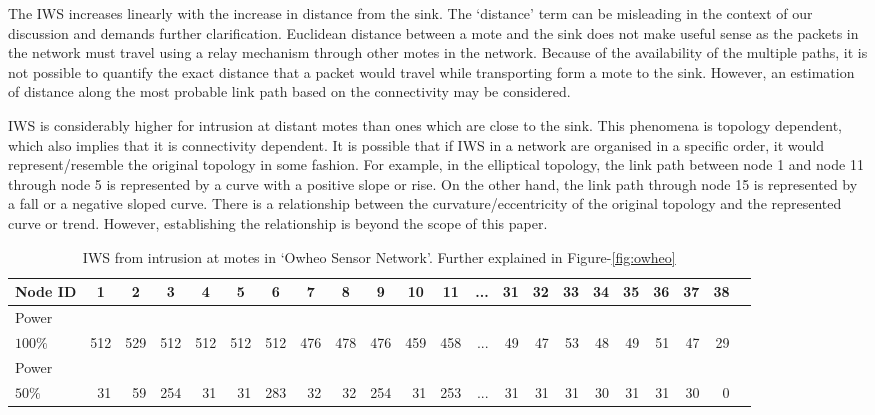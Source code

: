 \documentclass[conference,final]{IEEEtran}
\newcommand*{\bd}[1]{\multicolumn{1}{|c}{\bfseries #1}}
\begin{document}
The IWS increases linearly with the increase in distance from the sink.
The `distance' term can be misleading in the context of our discussion and demands further clarification.
Euclidean distance between a mote and the sink does not make useful sense as the packets in the network must travel using a relay mechanism through other motes in the network.
Because of the availability of the multiple paths, it is not possible to quantify the exact distance that a packet would travel while transporting form a mote to the sink.
However, an estimation of distance along the most probable link path based on the connectivity may be considered.

IWS is considerably higher for intrusion at distant motes than ones which are close to the sink.
This phenomena is topology dependent, which also implies   that it is connectivity dependent.
It is possible that if IWS in a network are organised in a specific order, it would represent/resemble   the original topology in some fashion.
For example, in the elliptical topology, the link path between node 1 and node 11 through node 5 is represented by a curve with a positive slope or rise.
On the other hand, the link path through node 15 is represented by a fall or a negative sloped curve.
There is a relationship between the curvature/eccentricity of the original topology and the represented curve or  trend.
However, establishing the relationship is beyond the scope of this paper.



\begin{table}[t!]
\centering
\begin{tabular}{|l|*{20}{r|}r}
\hline
\bd{Node ID}           & \bd{1} & \bd{2} & \bd{3} & \bd{4} & \bd{5} & \bd{6} & \bd{7} & \bd{8} & \bd{9} & \bd{10} & \bd{11} & \bd{...} & \bd{31} & \bd{32} & \bd{33} & \bd{34} & \bd{35} & \bd{36} & \bd{37} & \bd{38} \\
\hline		\hline

Power	  &  &  &  &  &  &  &  &  &  &  &  &  &  &  &   &  &  &  &  &  \\
$100\% $          & 512 & 529 & 512 & 512 & 512  & 512 & 476 & 478 & 476 & 459 & 458 & ...& 49 & 47 & 53  & 48 & 49 & 51 & 47 & 29 \\
\hline

Power	  &  &  &  &  &  &  &  &  &  &  &  &  &  &  &   &  &  &  &  &  \\
$50\%$            &31 & 59&254& 31& 31 &283& 32& 32& 254& 31 &253 & ...& 31 & 31 & 31  & 30 & 31 & 31 & 30 & 0 \\
\hline
\end{tabular}
\caption{IWS from intrusion at motes in `Owheo Sensor Network'. Further explained in Figure-\ref{fig:owheo}}
\label{tab:owheo}
\end{table}
\end{document}
